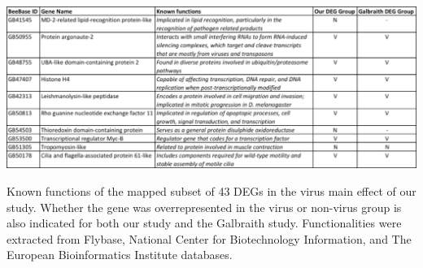 \documentclass[11pt,a4paper,oldfontcommands,openany]{memoir}
\numberwithin{equation}{section} %
\begin{document}
\begin{table}[H]
  \includegraphics[width=\textwidth]{Images/virusGenes}
  \caption{Known functions of the mapped subset of 43 DEGs in the virus main effect of our study. Whether the gene was overrepresented in the virus or non-virus group is also indicated for both our study and the Galbraith study. Functionalities were extracted from Flybase, National Center for Biotechnology Information, and The European Bioinformatics Institute databases.}
  \label{tbl:virusGenes}
\end{table}
\end{document}
